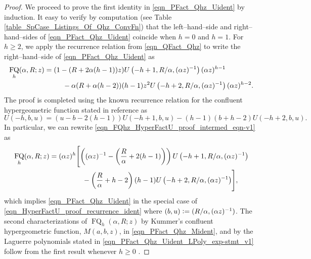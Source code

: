 \documentclass[12pt,reqno]{article}
\numberwithin{sfootnote}{section}
\numberwithin{equation}{section}
\theoremstyle{plain}
\theoremstyle{definition}
\theoremstyle{remark}
\newcommand{\defequals}{\ensuremath{\vcentcolon=}}
\newcommand{\HypU}[3]{\ensuremath{U\left(#1, #2, #3\right)}}
\DeclareMathOperator{\FQ}{FQ}
\begin{document}
\begin{proof} 
We proceed to prove the first identity in 
\eqref{eqn_PFact_Qhz_Uident} by induction. 
It easy to verify by computation 
(see Table \ref{table_SpCase_Listings_Of_Qhz_ConvFn}) 
that the left--hand--side and right--hand--sides of 
\eqref{eqn_PFact_Qhz_Uident} coincide when $h = 0$ and $h = 1$. 
For $h \geq 2$, we apply the recurrence relation 
from \eqref{eqn_QFact_Qhz} to write the 
right--hand--side of \eqref{eqn_PFact_Qhz_Uident} as 
\begin{align} 
\label{eqn_FQhz_HyperFactU_proof_intermed_eqn-v1} 
\FQ_h(\alpha, R; z) & = (1-(R+2\alpha (h-1)) z) 
     \HypU{-h+1}{R / \alpha}{(\alpha z)^{-1}} (\alpha z)^{h-1} \\ 
\notag 
   & \phantom{= (1\ \ } - 
     \alpha (R+\alpha (h-2)) (h-1) z^2 
     \HypU{-h+2}{R / \alpha}{(\alpha z)^{-1}} (\alpha z)^{h-2}. 
\end{align} 
The proof is completed using the 
known recurrence relation for the confluent hypergeometric function 
stated in reference as \citep[\S 13.3(i)]{NISTHB} 
\begin{equation} 
\label{eqn_HyperFactU_proof_recurrence_ident} 
\HypU{-h}{b}{u} = (u-b-2(h-1)) \HypU{-h+1}{b}{u} - 
     (h-1) (b+h-2) \HypU{-h+2}{b}{u}. 
\end{equation} 
In particular, we can rewrite 
\eqref{eqn_FQhz_HyperFactU_proof_intermed_eqn-v1} as 
\begin{align} 
\notag 
\FQ_h(\alpha, R; z) & = 
     (\alpha z)^{h} \Biggl[\left((\alpha z)^{-1}-\left( 
     \frac{R}{\alpha} + 2(h-1)\right)\right) 
     \HypU{-h+1}{R / \alpha}{(\alpha z)^{-1}} \\ 
   & \phantom{= (\alpha z)^{h} \Biggl[ \Bigl(} - 
     \left(\frac{R}{\alpha}+h-2\right) (h-1) 
     \HypU{-h+2}{R / \alpha}{(\alpha z)^{-1}}\Biggr], 
\end{align} 
which implies \eqref{eqn_PFact_Qhz_Uident} in the special case of 
\eqref{eqn_HyperFactU_proof_recurrence_ident} where 
$(b, u) \defequals (R / \alpha, (\alpha z)^{-1})$. 
The second characterizations of $\FQ_h(\alpha, R; z)$ by 
Kummer's confluent hypergeometric function, $M(a, b, z)$, 
in \eqref{eqn_PFact_Qhz_Mident}, and by the 
Laguerre polynomials stated in 
\eqref{eqn_PFact_Qhz_Uident_LPoly_exp-stmt_v1} follow from the 
first result whenever $h \geq 0$ \citep[\S 13.6(v), \S 18.11(i)]{NISTHB}. 
\end{proof} 
\end{document}
